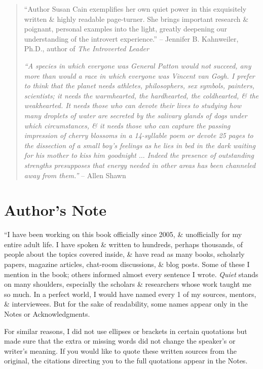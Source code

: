 \documentclass{article}
\numberwithin{equation}{section}
\begin{document}
\begin{quotation}
	``Author Susan Cain exemplifies her own quiet power in this exquisitely written \& highly readable page-turner. She brings important research \& poignant, personal examples into the light, greatly deepening our understanding of the introvert experience.'' -- Jennifer B. Kahnweiler, Ph.D., author of \textit{The Introverted Leader}
	
	\textit{``A species in which everyone was General Patton would not succeed, any more than would a race in which everyone was Vincent van Gogh. I prefer to think that the planet needs athletes, philosophers, sex symbols, painters, scientists; it needs the warmhearted, the hardhearted, the coldhearted, \& the weakhearted. It needs those who can devote their lives to studying how many droplets of water are secreted by the salivary glands of dogs under which circumstances, \& it needs those who can capture the passing impression of cherry blossoms in a 14-syllable poem or devote 25 pages to the dissection of a small boy's feelings as he lies in bed in the dark waiting for his mother to kiss him goodnight $\ldots$ Indeed the presence of outstanding strengths presupposes that energy needed in other areas has been channeled away from them.''} -- Allen Shawn
\end{quotation}


\section*{Author's Note}
``I have been working on this book officially since 2005, \& unofficially for my entire adult life. I have spoken \& written to hundreds, perhaps thousands, of people about the topics covered inside, \& have read as many books, scholarly papers, magazine articles, chat-room discussions, \& blog posts. Some of these I mention in the book; others informed almost every sentence I wrote. \textit{Quiet} stands on many shoulders, especially the scholars \& researchers whose work taught me so much. In a perfect world, I would have named every 1 of my sources, mentors, \& interviewees. But for the sake of readability, some names appear only in the Notes or Acknowledgments.

For similar reasons, I did not use ellipses or brackets in certain quotations but made sure that the extra or missing words did not change the speaker's or writer's meaning. If you would like to quote these written sources from the original, the citations directing you to the full quotations appear in the Notes.
\end{document}
